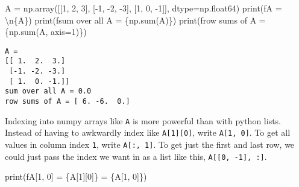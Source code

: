 \documentclass[
  letterpaper,
  DIV=11,
  numbers=noendperiod]{scrreprt}
\newenvironment{Shaded}{\begin{snugshade}}{\end{snugshade}}
\newcommand{\BuiltInTok}[1]{\textcolor[rgb]{0.00,0.23,0.31}{#1}}
\newcommand{\CharTok}[1]{\textcolor[rgb]{0.13,0.47,0.30}{#1}}
\newcommand{\DecValTok}[1]{\textcolor[rgb]{0.68,0.00,0.00}{#1}}
\newcommand{\NormalTok}[1]{\textcolor[rgb]{0.00,0.23,0.31}{#1}}
\newcommand{\OperatorTok}[1]{\textcolor[rgb]{0.37,0.37,0.37}{#1}}
\newcommand{\SpecialCharTok}[1]{\textcolor[rgb]{0.37,0.37,0.37}{#1}}
\newcommand{\SpecialStringTok}[1]{\textcolor[rgb]{0.13,0.47,0.30}{#1}}
\begin{document}
\begin{Shaded}
\begin{Highlighting}[]
\NormalTok{A }\OperatorTok{=}\NormalTok{ np.array([[}\DecValTok{1}\NormalTok{, }\DecValTok{2}\NormalTok{, }\DecValTok{3}\NormalTok{], [}\OperatorTok{{-}}\DecValTok{1}\NormalTok{, }\OperatorTok{{-}}\DecValTok{2}\NormalTok{, }\OperatorTok{{-}}\DecValTok{3}\NormalTok{], [}\DecValTok{1}\NormalTok{, }\DecValTok{0}\NormalTok{, }\OperatorTok{{-}}\DecValTok{1}\NormalTok{]], dtype}\OperatorTok{=}\NormalTok{np.float64)}
\BuiltInTok{print}\NormalTok{(}\SpecialStringTok{f\textquotesingle{}A = }\CharTok{\textbackslash{}n}\SpecialCharTok{\{}\NormalTok{A}\SpecialCharTok{\}}\SpecialStringTok{\textquotesingle{}}\NormalTok{)}
\BuiltInTok{print}\NormalTok{(}\SpecialStringTok{f\textquotesingle{}sum over all A = }\SpecialCharTok{\{}\NormalTok{np}\SpecialCharTok{.}\BuiltInTok{sum}\NormalTok{(A)}\SpecialCharTok{\}}\SpecialStringTok{\textquotesingle{}}\NormalTok{)}
\BuiltInTok{print}\NormalTok{(}\SpecialStringTok{f\textquotesingle{}row sums of A = }\SpecialCharTok{\{}\NormalTok{np}\SpecialCharTok{.}\BuiltInTok{sum}\NormalTok{(A, axis}\OperatorTok{=}\DecValTok{1}\NormalTok{)}\SpecialCharTok{\}}\SpecialStringTok{\textquotesingle{}}\NormalTok{)}
\end{Highlighting}
\end{Shaded}

\begin{verbatim}
A = 
[[ 1.  2.  3.]
 [-1. -2. -3.]
 [ 1.  0. -1.]]
sum over all A = 0.0
row sums of A = [ 6. -6.  0.]
\end{verbatim}

Indexing into numpy arrays like \texttt{A} is more powerful than with
python lists. Instead of having to awkwardly index like
\texttt{A{[}1{]}{[}0{]}}, write \texttt{A{[}1,\ 0{]}}. To get all values
in column index \texttt{1}, write \texttt{A{[}:,\ 1{]}}. To get just the
first and last row, we could just pass the index we want in as a list
like this, \texttt{A{[}{[}0,\ -1{]},\ :{]}}.

\begin{Shaded}
\begin{Highlighting}[]
\BuiltInTok{print}\NormalTok{(}\SpecialStringTok{f\textquotesingle{}A[1, 0] = }\SpecialCharTok{\{}\NormalTok{A[}\DecValTok{1}\NormalTok{][}\DecValTok{0}\NormalTok{]}\SpecialCharTok{\}}\SpecialStringTok{ = }\SpecialCharTok{\{}\NormalTok{A[}\DecValTok{1}\NormalTok{, }\DecValTok{0}\NormalTok{]}\SpecialCharTok{\}}\SpecialStringTok{\textquotesingle{}}\NormalTok{)}
\end{Highlighting}
\end{Shaded}
\end{document}
